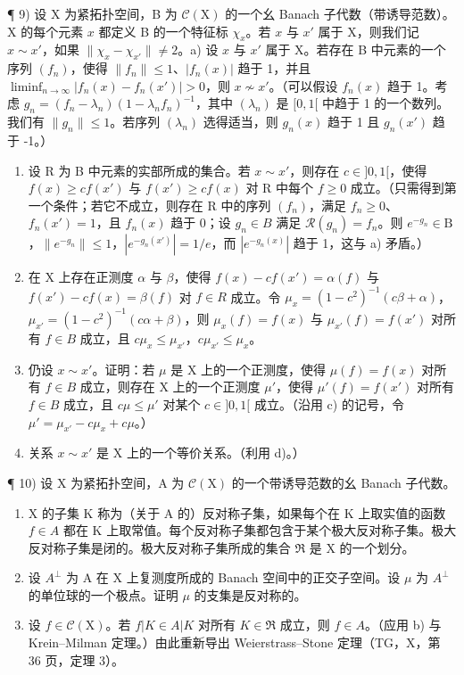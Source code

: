 ¶ 9) 设 X 为紧拓扑空间，B 为 \(\mathcal{C}(\mathrm{X})\) 的一个幺 Banach 子代数（带诱导范数）。X 的每个元素 \(x\) 都定义 B 的一个特征标 \(\chi_x\)。若 \(x\) 与 \(x'\) 属于 X，则我们记 \(x \sim x'\)，如果 \(\| \chi_x - \chi_{x'} \| \neq 2\)。a) 设 \(x\) 与 \(x'\) 属于 X。若存在 B 中元素的一个序列 \((f_n)\)，使得 \(\| f_n \| \leqslant 1\)、\(|f_n(x)|\) 趋于 1，并且 \(\liminf_{n \to \infty} |f_n(x) - f_n(x')| > 0\)，则 \(x\not\sim x'\)。（可以假设 \(f_n(x)\) 趋于 1。考虑 \(g_n = (f_n - \lambda_n)(1 - \lambda_n f_n)^{-1}\)，其中 \((\lambda_n)\) 是 \([0,1[\) 中趋于 1 的一个数列。我们有 \(\| g_n \| \leqslant 1\)。若序列 \((\lambda_n)\) 选得适当，则 \(g_n(x)\) 趋于 1 且 \(g_n(x')\) 趋于 -1。）

\begin{enumerate}
\def\labelenumi{\alph{enumi})}
\setcounter{enumi}{1}
\item
  设 R 为 B 中元素的实部所成的集合。若 \(x \sim x'\)，则存在 \(c \in ]0,1[\)，使得 \(f(x) \geqslant cf(x')\) 与 \(f(x') \geqslant cf(x)\) 对 R 中每个 \(f \geqslant 0\) 成立。（只需得到第一个条件；若它不成立，则存在 R 中的序列 \((f_n)\)，满足 \(f_n \geqslant 0\)、\(f_n(x') = 1\)，且 \(f_n(x)\) 趋于 0；设 \(g_n \in B\) 满足 \(\mathcal{R}(g_n) = f_n\)。则 \(e^{-g_n} \in \mathrm{B}\)，\(\| e^{-g_n} \| \leqslant 1\)，\(|e^{-g_n(x')}| = 1 / e\)，而 \(|e^{-g_n(x)}|\) 趋于 1，这与 a) 矛盾。）
\item
  在 X 上存在正测度 \(\alpha\) 与 \(\beta\)，使得 \(f(x)-cf(x')=\alpha(f)\) 与 \(f(x')-cf(x)=\beta(f)\) 对 \(f\in R\) 成立。令 \(\mu_{x}=(1-c^{2})^{-1}(c\beta+\alpha)\)，\(\mu_{x'}=(1-c^{2})^{-1}(c\alpha+\beta)\)，则 \(\mu_{x}(f)=f(x)\) 与 \(\mu_{x'}(f)=f(x')\) 对所有 \(f\in B\) 成立，且 \(c\mu_{x}\leqslant\mu_{x'}\)，\(c\mu_{x'}\leqslant\mu_{x}\)。
\item
  仍设 \(x \sim x'\)。证明：若 \(\mu\) 是 X 上的一个正测度，使得 \(\mu(f) = f(x)\) 对所有 \(f \in B\) 成立，则存在 X 上的一个正测度 \(\mu'\)，使得 \(\mu'(f) = f(x')\) 对所有 \(f \in B\) 成立，且 \(c\mu \leqslant \mu'\) 对某个 \(c \in]0,1[\) 成立。（沿用 c) 的记号，令 \(\mu' = \mu_{x'} - c\mu_x + c\mu\)。）
\item
  关系 \(x \sim x'\) 是 X 上的一个等价关系。（利用 d)。）
\end{enumerate}

¶ 10) 设 X 为紧拓扑空间，A 为 \(\mathcal{C}(\mathrm{X})\) 的一个带诱导范数的幺 Banach 子代数。

\begin{enumerate}
\def\labelenumi{\alph{enumi})}
\item
  X 的子集 K 称为（关于 A 的）反对称子集，如果每个在 K 上取实值的函数 \(f \in A\) 都在 K 上取常值。每个反对称子集都包含于某个极大反对称子集。极大反对称子集是闭的。极大反对称子集所成的集合 \(\mathfrak{R}\) 是 X 的一个划分。
\item
  设 \(A^{\perp}\) 为 A 在 X 上复测度所成的 Banach 空间中的正交子空间。设 \(\mu\) 为 \(A^{\perp}\) 的单位球的一个极点。证明 \(\mu\) 的支集是反对称的。
\item
  设 \(f \in \mathcal{C}(\mathrm{X})\)。若 \(f|K \in A|K\) 对所有 \(K \in \mathfrak{R}\) 成立，则 \(f \in A\)。（应用 b) 与 Krein–Milman 定理。）由此重新导出 Weierstrass–Stone 定理（TG，X，第 36 页，定理 3）。
\end{enumerate}

